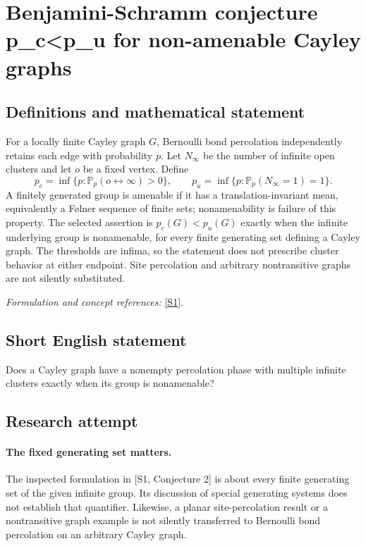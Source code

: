 \documentclass[11pt]{article}
\begin{document}
\section*{\texorpdfstring{Benjamini-Schramm conjecture p\_c<p\_u for non-amenable Cayley graphs}{Benjamini-Schramm conjecture p\_c<p\_u for non-amenable Cayley graphs}}\label{statement}
\subsection{Definitions and mathematical statement}
For a locally finite Cayley graph $G$, Bernoulli bond percolation independently retains each edge with probability $p$. Let $N_\infty$ be the number of infinite open clusters and let $o$ be a fixed vertex. Define
\[
 p_c=\inf\{p:{\mathbb{P}}_p(o\leftrightarrow\infty)>0\},\qquad
 p_u=\inf\{p:{\mathbb{P}}_p(N_\infty=1)=1\}.
\]
A finitely generated group is amenable if it has a translation-invariant mean, equivalently a F\o lner sequence of finite sets; nonamenability is failure of this property. The selected assertion is $p_c(G)<p_u(G)$ exactly when the infinite underlying group is nonamenable, for every finite generating set defining a Cayley graph. The thresholds are infima, so the statement does not prescribe cluster behavior at either endpoint. Site percolation and arbitrary nontransitive graphs are not silently substituted.
\par\smallskip\textit{Formulation and concept references:} \href{https://ar5iv.labs.arxiv.org/html/1712.04651}{[S1]}.

\subsection{Short English statement}
Does a Cayley graph have a nonempty percolation phase with multiple infinite clusters exactly when its group is nonamenable?
\subsection{Research attempt}
\paragraph{The fixed generating set matters.}
The inspected formulation in [S1, Conjecture 2] is about every
finite generating set of the given infinite group. Its discussion
of special generating systems does not establish that quantifier.
Likewise, a planar site-percolation result or a nontransitive graph
example is not silently transferred to Bernoulli bond percolation
on an arbitrary Cayley graph.
\end{document}
